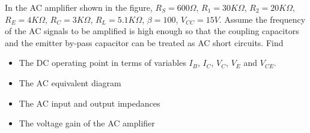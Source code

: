 % 

\item In the AC amplifier shown in the figure, $R_S=600\Omega$, $R_1=30K\Omega$, 
$R_2=20K\Omega$, $R_E=4K\Omega$, $R_C=3K\Omega$, $R_L=5.1K\Omega$, 
$\beta=100$, $V_{CC}=15V$. 
Assume the 
frequency of the AC signals to be amplified is high enough so that the
coupling capacitors and the emitter by-pass capacitor can be treated as 
AC short circuits. Find
\begin{itemize}
\item The DC operating point in terms of variables $I_B$, $I_C$, $V_C$, $V_E$ 
  and $V_{CE}$.
\item The AC equivalent diagram
\item The AC input and output impedances
\item The voltage gain of the AC amplifier
\end{itemize}



